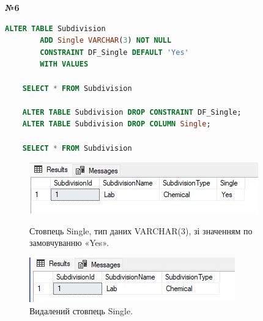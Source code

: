 \documentclass[a4paper,12pt]{article}
\begin{document}
	\begin{center}
		\textbf{№6}
	\end{center}
	\begin{lstlisting}[language=SQL]
	ALTER TABLE Subdivision
		ADD Single VARCHAR(3) NOT NULL 
		CONSTRAINT DF_Single DEFAULT 'Yes'
		WITH VALUES
	
	SELECT * FROM Subdivision
	
	ALTER TABLE Subdivision DROP CONSTRAINT DF_Single;
	ALTER TABLE Subdivision DROP COLUMN Single;
	
	SELECT * FROM Subdivision
	\end{lstlisting}
	\begin{figure}[h!]
		\centering
		\begin{minipage}[h]{0.9\linewidth}
			\includegraphics[width=1\linewidth]{Prt sc/Figure_5.jpg}  
		\end{minipage}
		\caption{Стовпець Single, тип даних VARCHAR(3), зі значенням по замовчуванню «Yes».}
		\begin{minipage}[h]{0.9\linewidth}
			\includegraphics[width=1\linewidth]{Prt sc/Figure_6.jpg}  
		\end{minipage}
		\caption{Видалений стовпець Single.}
	\end{figure}
	
\end{document}
